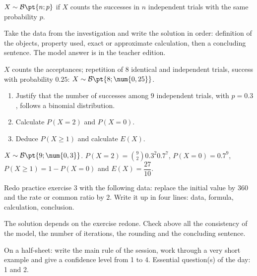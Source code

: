 \begin{summary}$X\sim\mathcal B\pt{n;p}$ if $X$ counts the successes in $n$ independent trials with the same probability $p$.\end{summary}

\begin{example}
Take the data from the investigation and write the solution in order: definition of the objects, property used, exact or approximate calculation, then a concluding sentence. The model answer is in the teacher edition.
\end{example}
\begin{solution}$X$ counts the acceptances; repetition of 8 identical and independent trials, success with probability $\num{0,25}$: $X\sim\mathcal B\pt{8;\num{0,25}}$.\end{solution}

\begin{exercise}[essential]
\begin{enumerate}\item Justify that the number of successes among $9$ independent trials, with $p=\num{0,3}$, follows a binomial distribution.\item Calculate $P(X=2)$ and $P(X=0)$.\item Deduce $P(X\geq1)$ and calculate $E(X)$.\end{enumerate}
\end{exercise}
\begin{solution}$X\sim\mathcal B\pt{9;\num{0,3}}$. $P(X=2)=\binom{9}2 \num{0,3}^2 \num{0,7}^{7}$, $P(X=0)=\num{0,7}^{9}$, $P(X\geq1)=1-P(X=0)$ and $E(X)=\dfrac{27}{10}$.\end{solution}


\begin{homework}Redo practice exercise 3 with the following data: replace the initial value by $360$ and the rate or common ratio by $2$. Write it up in four lines: data, formula, calculation, conclusion.\end{homework}
\begin{solution}The solution depends on the exercise redone. Check above all the consistency of the model, the number of iterations, the rounding and the concluding sentence.\end{solution}

\begin{exitticket}[3 minutes]On a half-sheet: write the main rule of the session, work through a very short example and give a confidence level from 1 to 4. Essential question(s) of the day: 1 and 2.\end{exitticket}

